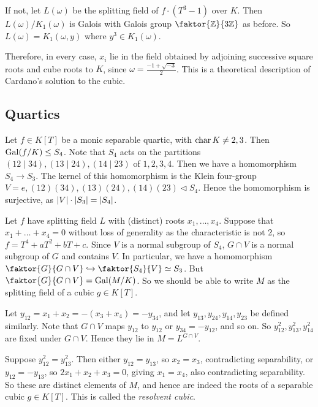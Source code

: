 If not, let \( L(\omega) \) be the splitting field of \( f \cdot (T^3 - 1) \) over \( K \).
Then \( L(\omega) / K_1(\omega) \) is Galois with Galois group \( \faktor{\mathbb Z}{3\mathbb Z} \) as before.
So \( L(\omega) = K_1(\omega, y) \) where \( y^3 \in K_1(\omega) \).

Therefore, in every case, \( x_i \) lie in the field obtained by adjoining successive square roots and cube roots to \( K \), since \( \omega = \frac{-1 + \sqrt{-3}}{2} \).
This is a theoretical description of Cardano's solution to the cubic.

\subsection{Quartics}
Let \( f \in K[T] \) be a monic separable quartic, with \( \operatorname{char} K \neq 2, 3 \).
Then \( \operatorname{Gal}(f/K) \leq S_4 \).
Note that \( S_4 \) acts on the partitions \( (12\mid 34), (13\mid 24), (14\mid 23) \) of \( {1, 2, 3, 4} \).
Then we have a homomorphism \( S_4 \to S_3 \).
The kernel of this homomorphism is the Klein four-group \( V = {e, (12)(34), (13)(24), (14)(23)} \triangleleft S_4 \).
Hence the homomorphism is surjective, as \( \lvert V\rvert \cdot \lvert S_3\rvert = \lvert S_4\rvert \).

Let \( f \) have splitting field \( L \) with (distinct) roots \( x_1, \dots, x_4 \).
Suppose that \( x_1 + \dots + x_4 = 0 \) without loss of generality as the characteristic is not 2, so \( f = T^4 + aT^2 + bT + c \).
Since \( V \) is a normal subgroup of \( S_4 \), \( G \cap V \) is a normal subgroup of \( G \) and contains \( V \).
In particular, we have a homomorphism \( \faktor{G}{G \cap V} \hookrightarrow \faktor{S_4}{V} \simeq S_3 \).
But \( \faktor{G}{G \cap V} = \Gal(M/K) \).
So we should be able to write \( M \) as the splitting field of a cubic \( g \in K[T] \).

Let \( y_{12} = x_1 + x_2 = -(x_3 + x_4) = -y_{34} \), and let \( y_{13}, y_{24}, y_{14}, y_{23} \) be defined similarly.
Note that \( G \cap V \) maps \( y_{12} \) to \( y_{12} \) or \( y_{34} = -y_{12} \), and so on.
So \( y_{12}^2, y_{13}^2, y_{14}^2 \) are fixed under \( G \cap V \).
Hence they lie in \( M = L^{G \cap V} \).

Suppose \( y_{12}^2 = y_{13}^2 \).
Then either \( y_{12} = y_{13} \), so \( x_2 = x_3 \), contradicting separability, or \( y_{12} = -y_{13} \), so \( 2x_1 + x_2 + x_3 = 0 \), giving \( x_1 = x_4 \), also contradicting separability.
So these are distinct elements of \( M \), and hence are indeed the roots of a separable cubic \( g \in K[T] \).
This is called the \emph{resolvent cubic}.

